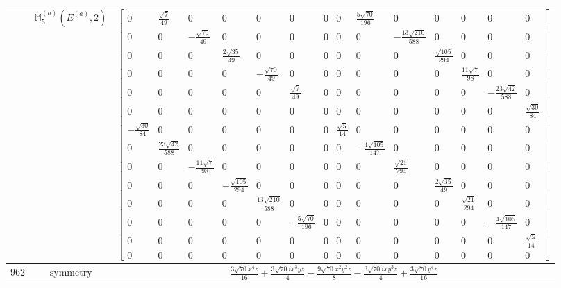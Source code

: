 \documentclass[fleqn,8pt,landscape]{jsarticle}
\begin{document}
\begin{longtable}{ccc}
$  $ & $ \mathbb{M}_{5}^{(a)}(E^{(a)},2) $ & $ \begin{bmatrix} 0 & \frac{\sqrt{7}}{49} & 0 & 0 & 0 & 0 & 0 & 0 & \frac{5 \sqrt{70}}{196} & 0 & 0 & 0 & 0 & 0 \\ 0 & 0 & - \frac{\sqrt{70}}{49} & 0 & 0 & 0 & 0 & 0 & 0 & - \frac{13 \sqrt{210}}{588} & 0 & 0 & 0 & 0 \\ 0 & 0 & 0 & \frac{2 \sqrt{35}}{49} & 0 & 0 & 0 & 0 & 0 & 0 & \frac{\sqrt{105}}{294} & 0 & 0 & 0 \\ 0 & 0 & 0 & 0 & - \frac{\sqrt{70}}{49} & 0 & 0 & 0 & 0 & 0 & 0 & \frac{11 \sqrt{7}}{98} & 0 & 0 \\ 0 & 0 & 0 & 0 & 0 & \frac{\sqrt{7}}{49} & 0 & 0 & 0 & 0 & 0 & 0 & - \frac{23 \sqrt{42}}{588} & 0 \\ 0 & 0 & 0 & 0 & 0 & 0 & 0 & 0 & 0 & 0 & 0 & 0 & 0 & \frac{\sqrt{30}}{84} \\ - \frac{\sqrt{30}}{84} & 0 & 0 & 0 & 0 & 0 & 0 & \frac{\sqrt{5}}{14} & 0 & 0 & 0 & 0 & 0 & 0 \\ 0 & \frac{23 \sqrt{42}}{588} & 0 & 0 & 0 & 0 & 0 & 0 & - \frac{4 \sqrt{105}}{147} & 0 & 0 & 0 & 0 & 0 \\ 0 & 0 & - \frac{11 \sqrt{7}}{98} & 0 & 0 & 0 & 0 & 0 & 0 & \frac{\sqrt{21}}{294} & 0 & 0 & 0 & 0 \\ 0 & 0 & 0 & - \frac{\sqrt{105}}{294} & 0 & 0 & 0 & 0 & 0 & 0 & \frac{2 \sqrt{35}}{49} & 0 & 0 & 0 \\ 0 & 0 & 0 & 0 & \frac{13 \sqrt{210}}{588} & 0 & 0 & 0 & 0 & 0 & 0 & \frac{\sqrt{21}}{294} & 0 & 0 \\ 0 & 0 & 0 & 0 & 0 & - \frac{5 \sqrt{70}}{196} & 0 & 0 & 0 & 0 & 0 & 0 & - \frac{4 \sqrt{105}}{147} & 0 \\ 0 & 0 & 0 & 0 & 0 & 0 & 0 & 0 & 0 & 0 & 0 & 0 & 0 & \frac{\sqrt{5}}{14} \\ 0 & 0 & 0 & 0 & 0 & 0 & 0 & 0 & 0 & 0 & 0 & 0 & 0 & 0 \end{bmatrix} $ \\ \hline
$ 962 $ & $ \text{symmetry} $ & $ \frac{3 \sqrt{70} x^{4} z}{16} + \frac{3 \sqrt{70} i x^{3} y z}{4} - \frac{9 \sqrt{70} x^{2} y^{2} z}{8} - \frac{3 \sqrt{70} i x y^{3} z}{4} + \frac{3 \sqrt{70} y^{4} z}{16} $ \\

\end{longtable}
\end{document}

